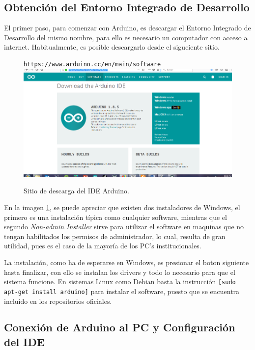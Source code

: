 \documentclass[letterpaper, 10pt]{report}
\begin{document}
\subsection{Obtención del Entorno Integrado de Desarrollo}

El primer paso, para comenzar con Arduino, es descargar el Entorno Integrado de Desarrollo del mismo nombre, para ello es necesario un computador con acceso a internet. Habitualmente, es posible descargarlo desde el sigueiente sitio.

\begin{figure}[h]
	\centering
	\texttt{https://www.arduino.cc/en/main/software}\\
	\includegraphics[scale=0.6]{download.png}
	\caption{Sitio de descarga del IDE Arduino.\label{descarga}}
\end{figure}		
		
En la imagen \ref{descarga}, se puede apreciar que existen dos instaladores de Windows, el primero es una instalación típica como cualquier software, mientras que el segundo \emph{Non-admin Installer} sirve para utilizar el software en maquinas que no tengan habilitados los permisos de administrador, lo cual, resulta de gran utilidad, pues es el caso de la mayoría de los PC's institucionales.

La instalación, como ha de esperarse en Windows, es presionar el boton siguiente hasta finalizar, con ello se instalan los drivers y todo lo necesario para que el sistema funcione. En sistemas Linux como Debian basta la instrucción \texttt{[sudo apt-get install arduino]} para instalar el software, puesto que se encuentra incluido en los repositorios oficiales. 
	
\subsection{Conexión de Arduino al PC y Configuración del IDE}
\end{document}
